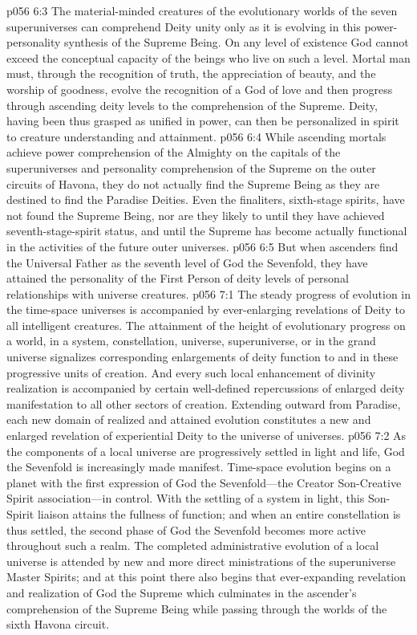 \pc \vs p056 6:3 The material\hyp{}minded creatures of the evolutionary worlds of the seven superuniverses can comprehend Deity unity only as it is evolving in this power\hyp{}personality synthesis of the Supreme Being. On any level of existence God cannot exceed the conceptual capacity of the beings who live on such a level. Mortal man must, through the recognition of truth, the appreciation of beauty, and the worship of goodness, evolve the recognition of a God of love and then progress through ascending deity levels to the comprehension of the Supreme. Deity, having been thus grasped as unified in power, can then be personalized in spirit to creature understanding and attainment.
\vs p056 6:4 While ascending mortals achieve power comprehension of the Almighty on the capitals of the superuniverses and personality comprehension of the Supreme on the outer circuits of Havona, they do not actually find the Supreme Being as they are destined to find the Paradise Deities. Even the finaliters, sixth\hyp{}stage spirits, have not found the Supreme Being, nor are they likely to until they have achieved seventh\hyp{}stage\hyp{}spirit status, and until the Supreme has become actually functional in the activities of the future outer universes.
\vs p056 6:5 But when ascenders find the Universal Father as the seventh level of God the Sevenfold, they have attained the personality of the First Person of  deity levels of personal relationships with universe creatures.
\vs p056 7:1 The steady progress of evolution in the time\hyp{}space universes is accompanied by ever\hyp{}enlarging revelations of Deity to all intelligent creatures. The attainment of the height of evolutionary progress on a world, in a system, constellation, universe, superuniverse, or in the grand universe signalizes corresponding enlargements of deity function to and in these progressive units of creation. And every such local enhancement of divinity realization is accompanied by certain well\hyp{}defined repercussions of enlarged deity manifestation to all other sectors of creation. Extending outward from Paradise, each new domain of realized and attained evolution constitutes a new and enlarged revelation of experiential Deity to the universe of universes.
\vs p056 7:2 As the components of a local universe are progressively settled in light and life, God the Sevenfold is increasingly made manifest. Time\hyp{}space evolution begins on a planet with the first expression of God the Sevenfold---the Creator Son\hyp{}Creative Spirit association---in control. With the settling of a system in light, this Son\hyp{}Spirit liaison attains the fullness of function; and when an entire constellation is thus settled, the second phase of God the Sevenfold becomes more active throughout such a realm. The completed administrative evolution of a local universe is attended by new and more direct ministrations of the superuniverse Master Spirits; and at this point there also begins that ever\hyp{}expanding revelation and realization of God the Supreme which culminates in the ascender’s comprehension of the Supreme Being while passing through the worlds of the sixth Havona circuit.
